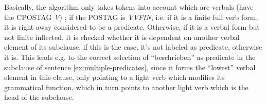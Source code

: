 
Basically, the algorithm only takes tokens into account which are verbals (have the CPOSTAG
\emph{V}) ; if the POSTAG is \emph{VVFIN}, i.e. if it is a finite full verb form,
it is right away considered to be a predicate. Otherwise, if it is a verbal form but not
finite inflected, it is checked whether it is dependent on another verbal element of its
subclause, if this is the case, it's not labeled as predicate, otherwise it is. This leads
e.g. to the correct selection of ``beschrieben'' as predicate in the subclause of sentence
\ref{ex:multiple-predicates}, since it forms the ``lowest'' verbal element in this clause,
only pointing to a light verb which modifies its grammatical function, which in turn points
to another light verb which is the head of the subclause.



